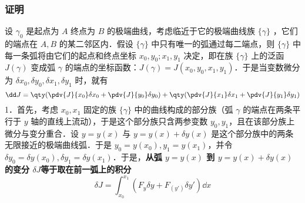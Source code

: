 \subsubsection{证明}
设 $\gamma_0$ 是起点为 $A$ 终点为 $B$ 的极端曲线，考虑临近于它的极端曲线族 $\{\gamma\}$ ，它们的端点在 $A,B$ 的某二邻区内．假设 $\{\gamma\}$ 中只有唯一的弧通过每二端点，则 $\{\gamma\}$ 中每一条弧将由它们的起点和终点坐标 $x_0,y_0;x_1,y_1$ 决定，即在族 $\{\gamma\}$ 上的泛函 $J(\gamma)$ 变成弧 $\gamma$ 的端点的坐标函数：$J(\gamma)=J(x_0,y_0,x_1,y_1)$．于是当变数微分为 $\delta x_0,\delta y_0,\delta x_1,\delta y_1$ 时，就有
\begin{equation}
\dd J=\qty(\pdv{J}{x_0}\delta x_0+\pdv{J}{y_0}\delta y_0)+\qty(\pdv{J}{x_1}\delta x_1+\pdv{J}{y_1}\delta y_1)
\end{equation}
1．首先，考虑 $x_0,x_1$ 固定的族 $\{\gamma\}$ 中的曲线构成的部分族（弧 $\gamma$ 的端点在两条平行于 $y$ 轴的直线上流动），于是这个部分族只含两参变数 $y_0,y_1$，且在该部分族上微分与变分重合．设 $y=y(x)$ 与 $y=y(x)+\delta y(x)$ 是这个部分族中的两条无限接近的极端曲线弧．于是 $y_0=y(x_0),y_1=y(x_1)$，并令 $\delta y_0=\delta y(x_0),\delta y_1=\delta y(x_1)$．于是，\textbf{从弧 $y=y(x)$ 到 $y=y(x)+\delta y(x)$ 的变分 $\delta J$等于取在前一弧上的积分}
\begin{equation}
\delta J=\int_{x_0}^{x_1}(F_{y}\delta y+F_(y')\delta y')\dd x
\end{equation}
